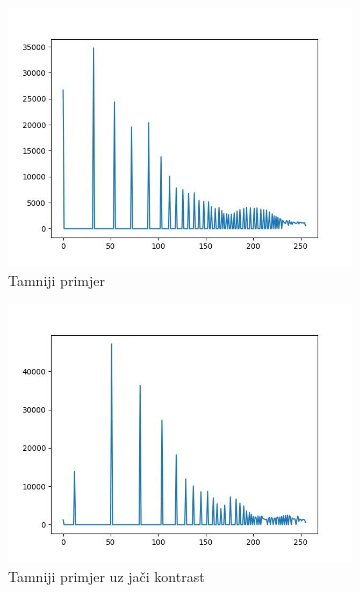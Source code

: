 \documentclass[times, utf8, diplomski]{fer}
\begin{document}
\begin{figure}[H]
     \centering
     \begin{subfigure}[b]{0.4\textwidth}
         \centering
         \includegraphics[width=\textwidth]{figures/ce_examples/1/hist_eq.jpg}
         \caption{Tamniji primjer}
     \end{subfigure}
     \begin{subfigure}[b]{0.4\textwidth}
         \centering
         \includegraphics[width=\textwidth]{figures/ce_examples/2/hist_eq.jpg}
         \caption{Tamniji primjer uz jači kontrast}
     \end{subfigure}
     \begin{subfigure}[b]{0.4\textwidth}
         \centering

\end{subfigure}
\end{figure}
\end{document}
